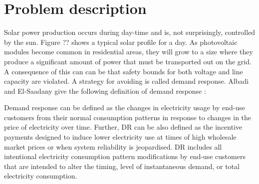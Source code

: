 \documentclass[class=book, crop=false]{standalone}
\begin{document}
\section{Problem description}\label{section:problem_description}
Solar power production occurs during day-time and is, not surprisingly, controlled by the sun. Figure ?? shows a typical solar profile for a day. As photovoltaic modules become common in residential areas, they will grow to a size where they produce a significant amount of power that must be transported out on the grid. A consequence of this can can be that safety bounds for both voltage and line capacity are violated. A strategy for avoiding is called demand response. Albadi and El-Saadany give the following definition of demand response \cite{demand_response_definition}:

\begin{displayquote}
Demand response can be defined as the changes in electricity usage by end-use customers from their normal consumption patterns in response to changes in the price of electricity over time. Further, DR can be also defined as the incentive payments designed to induce lower electricity use at times of high wholesale market prices or when system reliability is jeopardised. DR includes all intentional electricity consumption pattern modifications by end-use customers that are intended to alter the timing, level of
instantaneous demand, or total electricity consumption.
\end{displayquote}
\end{document}
